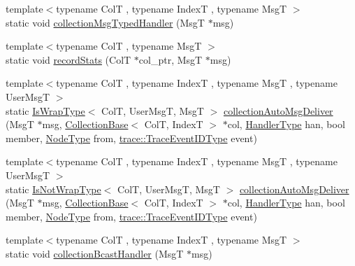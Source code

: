 \begin{DoxyCompactItemize}
\item 
{\footnotesize template$<$typename ColT , typename IndexT , typename MsgT $>$ }\\static void \hyperlink{structvt_1_1vrt_1_1collection_1_1_collection_manager_a7bb443544c8c4b94a7a10a0ec8126018}{collection\+Msg\+Typed\+Handler} (MsgT $\ast$msg)
\item 
{\footnotesize template$<$typename ColT , typename MsgT $>$ }\\static void \hyperlink{structvt_1_1vrt_1_1collection_1_1_collection_manager_a3d49cc2ae24c50443e890e9447d408a9}{record\+Stats} (ColT $\ast$col\+\_\+ptr, MsgT $\ast$msg)
\item 
{\footnotesize template$<$typename ColT , typename IndexT , typename MsgT , typename User\+MsgT $>$ }\\static \hyperlink{structvt_1_1vrt_1_1collection_1_1_collection_manager_a1f91c97ed52237c3a3576dfbbe87c8f8}{Is\+Wrap\+Type}$<$ ColT, User\+MsgT, MsgT $>$ \hyperlink{structvt_1_1vrt_1_1collection_1_1_collection_manager_a4816815fd287f57cab4db958985c193c}{collection\+Auto\+Msg\+Deliver} (MsgT $\ast$msg, \hyperlink{structvt_1_1vrt_1_1collection_1_1_collection_base}{Collection\+Base}$<$ ColT, IndexT $>$ $\ast$col, \hyperlink{namespacevt_af64846b57dfcaf104da3ef6967917573}{Handler\+Type} han, bool member, \hyperlink{namespacevt_a866da9d0efc19c0a1ce79e9e492f47e2}{Node\+Type} from, \hyperlink{namespacevt_1_1trace_a64a7185f3e102df8d8258f263ccd1582}{trace\+::\+Trace\+Event\+I\+D\+Type} event)
\item 
{\footnotesize template$<$typename ColT , typename IndexT , typename MsgT , typename User\+MsgT $>$ }\\static \hyperlink{structvt_1_1vrt_1_1collection_1_1_collection_manager_a18e3a17d9eb086c6c2f499242b7faa1e}{Is\+Not\+Wrap\+Type}$<$ ColT, User\+MsgT, MsgT $>$ \hyperlink{structvt_1_1vrt_1_1collection_1_1_collection_manager_a14b3a40fcde230a6113d032b8175d15d}{collection\+Auto\+Msg\+Deliver} (MsgT $\ast$msg, \hyperlink{structvt_1_1vrt_1_1collection_1_1_collection_base}{Collection\+Base}$<$ ColT, IndexT $>$ $\ast$col, \hyperlink{namespacevt_af64846b57dfcaf104da3ef6967917573}{Handler\+Type} han, bool member, \hyperlink{namespacevt_a866da9d0efc19c0a1ce79e9e492f47e2}{Node\+Type} from, \hyperlink{namespacevt_1_1trace_a64a7185f3e102df8d8258f263ccd1582}{trace\+::\+Trace\+Event\+I\+D\+Type} event)
\item 
{\footnotesize template$<$typename ColT , typename IndexT , typename MsgT $>$ }\\static void \hyperlink{structvt_1_1vrt_1_1collection_1_1_collection_manager_a2a9fcbafc83d78d80c8d5f758e880b47}{collection\+Bcast\+Handler} (MsgT $\ast$msg)

\end{DoxyCompactItemize}
